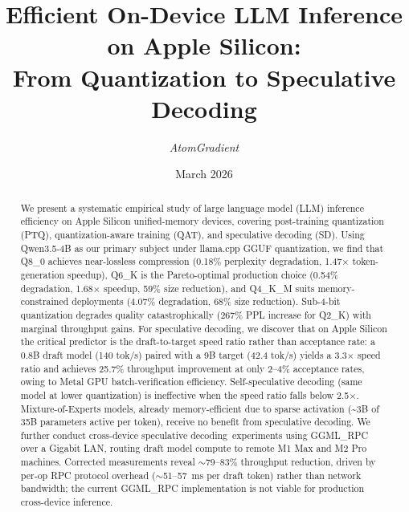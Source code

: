 \documentclass[11pt,a4paper]{article}
\newcommand{\SD}{speculative decoding}
\begin{document}

\title{\textbf{Efficient On-Device LLM Inference on Apple Silicon:\\
From Quantization to Speculative Decoding}}

\author{\textit{AtomGradient}}
\date{March 2026}

\maketitle
\thispagestyle{plain}

\begin{abstract}
We present a systematic empirical study of large language model (LLM) inference
efficiency on Apple Silicon unified-memory devices, covering post-training
quantization (PTQ), quantization-aware training (QAT), and speculative decoding
(SD).
Using Qwen3.5-4B as our primary subject under llama.cpp GGUF quantization,
we find that Q8\_0 achieves near-lossless compression (0.18\% perplexity
degradation, 1.47$\times$ token-generation speedup), Q6\_K is the Pareto-optimal
production choice (0.54\% degradation, 1.68$\times$ speedup, 59\% size
reduction), and Q4\_K\_M suits memory-constrained deployments (4.07\%
degradation, 68\% size reduction).
Sub-4-bit quantization degrades quality catastrophically (267\% PPL increase for
Q2\_K) with marginal throughput gains.
For \SD, we discover that on Apple Silicon the critical predictor is the
draft-to-target speed ratio rather than acceptance rate: a 0.8B draft model
(140 tok/s) paired with a 9B target (42.4 tok/s) yields a 3.3$\times$ speed ratio
and achieves 25.7\% throughput improvement at only 2--4\% acceptance rates,
owing to Metal GPU batch-verification efficiency.
Self-speculative decoding (same model at lower quantization) is ineffective when
the speed ratio falls below 2.5$\times$.
Mixture-of-Experts models, already memory-efficient due to sparse activation
(\textasciitilde3B of 35B parameters active per token), receive no benefit from
\SD.
We further conduct cross-device \SD\ experiments using GGML\_RPC over a Gigabit
LAN, routing draft model compute to remote M1 Max and M2 Pro machines.
Corrected measurements reveal $\sim$79--83\% throughput reduction, driven by
per-op RPC protocol overhead ($\sim$51--57~ms per draft token) rather than
network bandwidth; the current GGML\_RPC implementation is not viable for
production cross-device inference.
\end{abstract}
\end{document}
